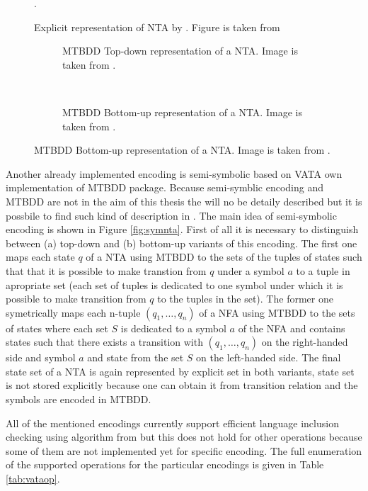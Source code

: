 \begin{figure}[bt]
\begin{center}

	\caption{Explicit representation of NTA by \vata. Figure is taken from \cite{tacas12}}.
	\label{fig:explnta}
\end{center}
\end{figure}

\begingroup
{}%
\begin{figure}[bt]
\label{fig:symnta}
	\centering
	\begin{subfigure}{.5\textwidth}
		\centering
		
		\caption{MTBDD Top-down representation of a NTA. Image is taken from \cite{tacas12}.}
		\label{fig:mtbdd_td}
	\end{subfigure}%
	~
	\begin{subfigure}{.5\textwidth}
	\centering
	
	\caption{MTBDD Bottom-up representation of a NTA. Image is taken from \cite{tacas12}.}
	\label{fig:mtbdd_bu}
	\end{subfigure}%
\end{figure}
\endgroup

Another already implemented encoding is semi-symbolic based on VATA own implementation of MTBDD package.
Because semi-symblic encoding and MTBDD are not in the aim of this thesis the will no be detaily described
but it is possbile to find such kind of description in \cite{lengal10}.
The main idea of semi-symbolic encoding is shown in Figure \ref{fig:symnta}.
First of all it is necessary to distinguish between (a) top-down and (b) bottom-up variants of this encoding.
The first one maps each state $q$ of a NTA using MTBDD to the sets of the tuples of states such that that it is possible
to make transtion from $q$ under a symbol $a$ to a tuple in apropriate set (each set of tuples is dedicated
to one symbol under which it is possible to make transition from $q$ to the tuples in the set).
The former one symetrically maps each n-tuple $(q_1,\ldots,q_n)$ of a NFA using MTBDD to the sets of states
where each set $S$ is dedicated to a symbol $a$ of the NFA and contains states such that there exists a transition
with $(q_1,\ldots,q_n)$ on the right-handed side and symbol $a$ and state from the set $S$ on the left-handed side.
The final state set of a NTA is again represented by explicit set in both variants,
state set is not stored explicitly because one can obtain it from transition relation and
the symbols are encoded in MTBDD.

All of the mentioned encodings currently support efficient language inclusion checking using algorithm
from \cite{tacas10} but this does not hold for other operations because some of them are not implemented yet for specific encoding.
The full enumeration of the supported operations for the particular encodings is given in Table \ref{tab:vataop}.

